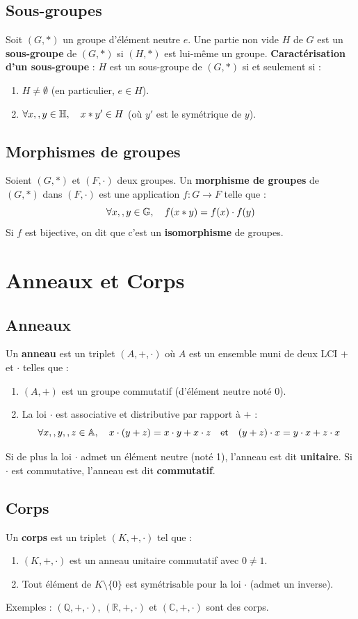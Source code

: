 \documentclass{article}
\begin{document}
	\subsection{Sous-groupes}
	Soit $(G, *)$ un groupe d'élément neutre $e$. Une partie non vide $H$ de $G$ est un \textbf{sous-groupe} de $(G, *)$ si $(H, *)$ est lui-même un groupe.
	\textbf{Caractérisation d'un sous-groupe} :
	$H$ est un sous-groupe de $(G, *)$ si et seulement si :
	\begin{enumerate}
		\item $H \ne \emptyset$ (en particulier, $e \in H$).
		\item $\qcq{x}[, y]{H}, \quad x * y' \in H$ (où $y'$ est le symétrique de $y$).
	\end{enumerate}
	
	\subsection{Morphismes de groupes}
	Soient $(G, *)$ et $(F, \cdot)$ deux groupes. Un \textbf{morphisme de groupes} de $(G, *)$ dans $(F, \cdot)$ est une application $f: G \to F$ telle que :
	\[ \qcq{x}[, y]{G}, \quad f(x * y) = f(x) \cdot f(y) \]
	Si $f$ est bijective, on dit que c'est un \textbf{isomorphisme} de groupes.
	
	\section{Anneaux et Corps}
	
	\subsection{Anneaux}
	Un \textbf{anneau} est un triplet $(A, +, \cdot)$ où $A$ est un ensemble muni de deux LCI $+$ et $\cdot$ telles que :
	\begin{enumerate}
		\item $(A, +)$ est un groupe commutatif (d'élément neutre noté 0).
		\item La loi $\cdot$ est associative et distributive par rapport à $+$ :
		\[ \qcq{x}[, y][, z]{A}, \quad x \cdot (y + z) = x \cdot y + x \cdot z \quad \text{et} \quad (y + z) \cdot x = y \cdot x + z \cdot x \]
	\end{enumerate}
	Si de plus la loi $\cdot$ admet un élément neutre (noté 1), l'anneau est dit \textbf{unitaire}. Si $\cdot$ est commutative, l'anneau est dit \textbf{commutatif}.
	
	\subsection{Corps}
	Un \textbf{corps} est un triplet $(K, +, \cdot)$ tel que :
	\begin{enumerate}
		\item $(K, +, \cdot)$ est un anneau unitaire commutatif avec $0 \ne 1$.
		\item Tout élément de $K \setminus \{0\}$ est symétrisable pour la loi $\cdot$ (admet un inverse).
	\end{enumerate}
	Exemples : $(\mathbb{Q}, +, \cdot)$, $(\mathbb{R}, +, \cdot)$ et $(\mathbb{C}, +, \cdot)$ sont des corps.
	
\end{document}
